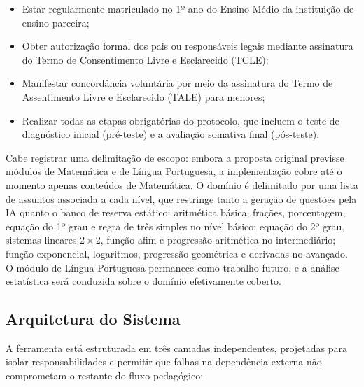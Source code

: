 \documentclass[10pt, a4paper, twocolumn]{article}
\begin{document}
\begin{itemize}[leftmargin=0.4cm, itemsep=2pt, parsep=0pt]
    \item Estar regularmente matriculado no 1º ano do Ensino Médio da
    instituição de ensino parceira;
    \item Obter autorização formal dos pais ou responsáveis legais mediante
    assinatura do Termo de Consentimento Livre e Esclarecido (TCLE);
    \item Manifestar concordância voluntária por meio da assinatura do Termo de
    Assentimento Livre e Esclarecido (TALE) para menores;
    \item Realizar todas as etapas obrigatórias do protocolo, que incluem o teste
    de diagnóstico inicial (pré-teste) e a avaliação somativa final (pós-teste).
\end{itemize}

Cabe registrar uma delimitação de escopo: embora a proposta original previsse
módulos de Matemática e de Língua Portuguesa, a implementação cobre até o
momento apenas conteúdos de Matemática. O domínio é delimitado por uma lista de
assuntos associada a cada nível, que restringe tanto a geração de questões pela
IA quanto o banco de reserva estático: aritmética básica, frações, porcentagem,
equação do 1º grau e regra de três simples no nível básico; equação do 2º grau,
sistemas lineares $2 \times 2$, função afim e progressão aritmética no
intermediário; função exponencial, logaritmos, progressão geométrica e derivadas
no avançado. O módulo de Língua Portuguesa permanece como trabalho futuro, e a
análise estatística será conduzida sobre o domínio efetivamente coberto.

\subsection{Arquitetura do Sistema}
\label{subsec:arquitetura}

A ferramenta está estruturada em três camadas independentes, projetadas para
isolar responsabilidades e permitir que falhas na dependência externa não
comprometam o restante do fluxo pedagógico:
\end{document}
